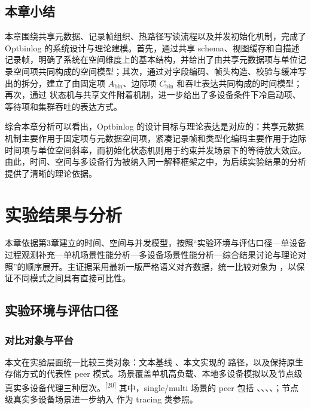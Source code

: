\subsection{本章小结}\label{ux672cux7ae0ux5c0fux7ed3-1}

本章围绕共享元数据、记录帧组织、热路径写读流程以及并发初始化机制，完成了 Optbinlog 的系统设计与理论建模。首先，通过共享 schema、视图缓存和自描述记录帧，明确了系统在空间维度上的基本结构，并给出了由共享元数据项与单位记录空间项共同构成的空间模型；其次，通过对字段编码、帧头构造、校验与缓冲写出的拆分，建立了由固定项 \(A_{\text{bin}}\)、边际项 \(C_{\text{bin}}\) 和吞吐表达共同构成的时间模型；再次，通过  \textrightarrow{}  状态机与共享文件附着机制，进一步给出了多设备条件下冷启动项、等待项和集群吞吐的表达方式。

综合本章分析可以看出，Optbinlog 的设计目标与理论表达是对应的：共享元数据机制主要作用于固定项与元数据空间项，紧凑记录帧和类型化编码主要作用于边际时间项与单位空间斜率，而初始化状态机则用于约束并发场景下的等待放大效应。由此，时间、空间与多设备行为被纳入同一解释框架之中，为后续实验结果的分析提供了清晰的理论依据。

\section{实验结果与分析}\label{ux5b9eux9a8cux7ed3ux679cux4e0eux5206ux6790}

本章依据第3章建立的时间、空间与并发模型，按照``实验环境与评估口径---单设备过程观测补充---单机场景性能分析---多设备场景性能分析---综合结果讨论与理论对照''的顺序展开。主证据采用最新一版严格语义对齐数据，统一比较对象为 ，以保证不同模式之间具有直接可比性。

\subsection{实验环境与评估口径}\label{ux5b9eux9a8cux73afux5883ux4e0eux8bc4ux4f30ux53e3ux5f84}

\subsubsection{对比对象与平台}\label{ux5bf9ux6bd4ux5bf9ux8c61ux4e0eux5e73ux53f0}

本文在实验层面统一比较三类对象：文本基线 、本文实现的  路径，以及保持原生存储方式的代表性 peer 模式。场景覆盖单机高负载、本地多设备模拟以及节点级真实多设备代理三种层次。\textsuperscript{[20]} 其中，single/multi 场景的 peer 包括 、、、、；节点级真实多设备场景进一步纳入  作为 tracing 类参照。

